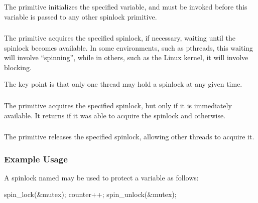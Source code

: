 \subsubsection{}

The  primitive initializes the specified
 variable, and must be invoked before
this variable is passed to any other spinlock primitive.

\subsubsection{}

The  primitive acquires the specified spinlock,
if necessary, waiting until the spinlock becomes available.
In some environments, such as pthreads, this waiting will involve
``spinning'', while
in others, such as the Linux kernel, it will involve blocking.

The key point is that only one thread may hold a spinlock at any
given time.

\subsubsection{}

The  primitive acquires the specified spinlock,
but only if it is immediately available.
It returns  if it was able to acquire the spinlock and
 otherwise.

\subsubsection{}

The  primitive releases the specified spinlock,
allowing other threads to acquire it.


\subsubsection{Example Usage}

A spinlock named  may be used to protect a variable
 as follows:

\begin{VerbatimU}
spin_lock(&mutex);
counter++;
spin_unlock(&mutex);
\end{VerbatimU}

